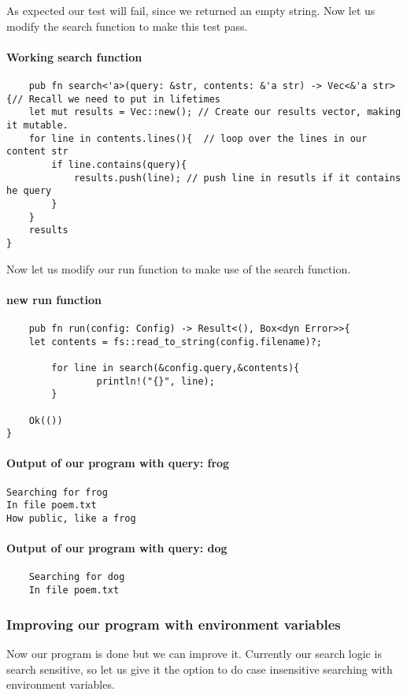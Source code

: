As expected our test will fail, since we returned an empty string. Now let us modify the search function to make this test pass.

\paragraph*{Working search function}\begin{lstlisting}
    pub fn search<'a>(query: &str, contents: &'a str) -> Vec<&'a str>{// Recall we need to put in lifetimes
    let mut results = Vec::new(); // Create our results vector, making it mutable.
    for line in contents.lines(){  // loop over the lines in our content str
        if line.contains(query){
            results.push(line); // push line in resutls if it contains he query 
        }
    }
    results
}
\end{lstlisting}

Now let us modify our run function to make use of the search function.

\paragraph*{new run function}\begin{lstlisting}
    pub fn run(config: Config) -> Result<(), Box<dyn Error>>{
    let contents = fs::read_to_string(config.filename)?;  

        for line in search(&config.query,&contents){
                println!("{}", line);
        }

    Ok(())
}
\end{lstlisting}

\paragraph*{Output of our program with query: frog}\begin{lstlisting}
Searching for frog
In file poem.txt
How public, like a frog
\end{lstlisting}

\paragraph*{Output of our program with query: dog}\begin{lstlisting}
    Searching for dog
    In file poem.txt
\end{lstlisting}
\subsubsection{Improving our program with environment variables}
Now our program is done but we can improve it. Currently our search logic is search sensitive, so let us give it the option to do case insensitive searching with environment variables.
 

